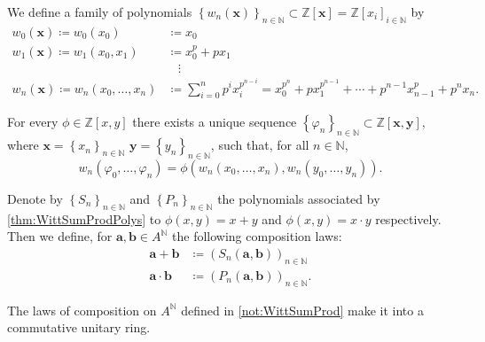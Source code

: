 \begin{defn}%
	We define a family of polynomials $\left\{ w_n(\mathbf{x}) \right\}_{n \in \mathbb{N}} \subset
	\mathbb{Z}[\mathbf{x}] = \mathbb{Z}[x_i]_{i \in \mathbb{N}}$ by
	\begin{align*}
		w_0(\mathbf{x}) \coloneqq w_0(x_0) &\coloneqq x_0 \\
		w_1(\mathbf{x}) \coloneqq w_1(x_0, x_1) &\coloneqq x_0^p + px_1 \\
				&\ \ \ \ \! \vdots \\
		w_n(\mathbf{x}) \coloneqq w_n(x_0, \ldots, x_n) &\coloneqq
		\sum_{ i=0 }^{ n } p^i x_i^{p^{n-i}} =
		x_0^{p^n} + px_1^{p^{n-1}} + \cdots + p^{n-1}x_{n-1}^p + p^n x_n
	.\end{align*}
\end{defn}


\begin{lem}\label{thm:WittSumProdPolys}
	For every $\phi \in \mathbb{Z}[x,y]$ there exists a unique sequence
	$\left\{ \varphi_n \right\}_{n \in \mathbb{N}} \subset \mathbb{Z}[\mathbf{x}, \mathbf{y}]$,
	where $\mathbf{x} = \left\{ x_n \right\}_{n \in \mathbb{N}}$
	$\mathbf{y} = \left\{ y_n \right\}_{n \in \mathbb{N}}$, such that,
	for all $n \in \mathbb{N}$,
	\begin{equation*}
		w_n(\varphi_0, \ldots, \varphi_n) =
		\phi \left( w_n(x_0, \ldots, x_n), w_n(y_0, \ldots, y_n) \right)
	.\end{equation*}
\end{lem} 


\begin{ntt}[]\label{not:WittSumProd}
	Denote by $\left\{ S_n \right\}_{n \in \mathbb{N}}$ and
	$\left\{ P_n \right\}_{n \in \mathbb{N}}$ the polynomials associated 
	by \cref{thm:WittSumProdPolys} to 
	$\phi(x,y) = x + y$ and $\phi(x,y) = x \cdot y$ respectively.
	Then we define, for $\mathbf{a},\mathbf{b} \in A^{\mathbb{N}}$ the following
	composition laws:
	\begin{align*}
		\mathbf{a} + \mathbf{b} &\coloneqq
		\left( S_n(\mathbf{a},\mathbf{b}) \right)_{n \in \mathbb{N}}\\
		\mathbf{a} \cdot \mathbf{b} &\coloneqq 
		\left( P_n(\mathbf{a},\mathbf{b}) \right)_{n \in \mathbb{N}}
	.\end{align*}
\end{ntt}


\begin{thm}
	The laws of composition on $A^{\mathbb{N}}$ defined in \cref{not:WittSumProd}
	make it into a commutative unitary ring.
\end{thm}



